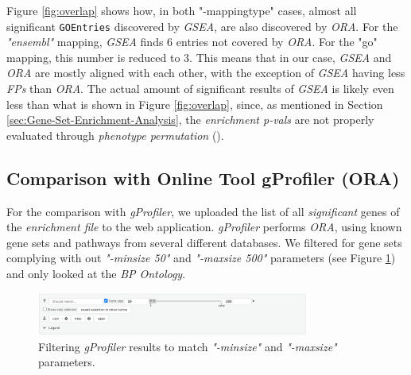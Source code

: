 \documentclass[12pt]{article}
\begin{document}
Figure \ref{fig:overlap} shows how, in both "-mappingtype" cases, almost all significant
\texttt{GOEntries} discovered by \textit{GSEA}, are also discovered by \textit{ORA}.
For the \textit{"ensembl"} mapping, \textit{GSEA} finds 6 entries not covered by \textit{ORA}.
For the "go" mapping, this number is reduced to 3.
This means that in our case, \textit{GSEA} and \textit{ORA} are mostly aligned with each other,
with the exception of \textit{GSEA} having less \textit{FPs} than \textit{ORA}.
The actual amount of significant results of \textit{GSEA} is likely even less than what is shown
in Figure \ref{fig:overlap}, since, as mentioned in Section \ref{sec:Gene-Set-Enrichment-Analysis},
the \textit{enrichment p-vals} are not properly evaluated through \textit{phenotype permutation} (\cite{GSEA}).

\subsection{Comparison with Online Tool gProfiler (ORA)}\label{sec:Comparison-of-ORA}
For the comparison with \textit{gProfiler}, we uploaded the list of all \textit{significant} genes
of the \textit{enrichment file} to the web application. \textit{gProfiler} performs
\textit{ORA}, using known gene sets and pathways from several different databases.
We filtered for gene sets complying with out \textit{"-minsize 50"} and \textit{"-maxsize 500"}
parameters (see Figure \ref{fig:-screenshots-gProfiler-png}) and only looked at 
the \textit{BP Ontology}. 
\begin{figure}[H]
    \centering
    \includegraphics[width=0.8\textwidth]{./screenshots/gProfiler.png}
    \caption{Filtering \textit{gProfiler} results to match \textit{"-minsize"} and \textit{"-maxsize"} parameters.}
    \label{fig:-screenshots-gProfiler-png}
\end{figure}
\end{document}
